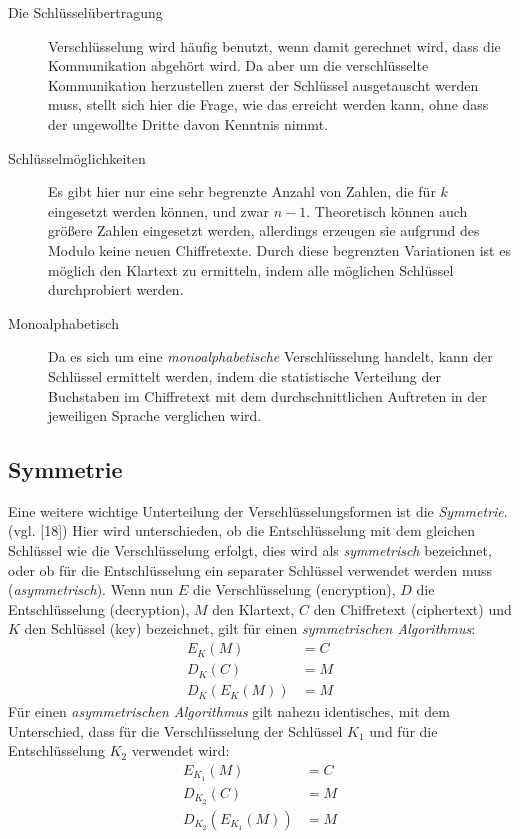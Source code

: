 \documentclass{scrarticle}
\begin{document}
    \begin{description}
        \item[Die Schlüsselübertragung] Verschlüsselung wird häufig benutzt, wenn damit gerechnet wird, dass die Kommunikation abgehört wird. Da aber um die verschlüsselte Kommunikation herzustellen zuerst der Schlüssel ausgetauscht werden muss, stellt sich hier die Frage, wie das erreicht werden kann, ohne dass der ungewollte Dritte davon Kenntnis nimmt.
        \item[Schlüsselmöglichkeiten] Es gibt hier nur eine sehr begrenzte Anzahl von Zahlen, die für $k$ eingesetzt werden können, und zwar $n-1$. Theoretisch können auch größere Zahlen eingesetzt werden, allerdings erzeugen sie aufgrund des Modulo keine neuen Chiffretexte. Durch diese begrenzten Variationen ist es möglich den Klartext zu ermitteln, indem alle möglichen Schlüssel durchprobiert werden.
        \item[Monoalphabetisch] Da es sich um eine \emph{monoalphabetische} Verschlüsselung handelt, kann der Schlüssel ermittelt werden, indem die statistische Verteilung der Buchstaben im Chiffretext mit dem durchschnittlichen Auftreten in der jeweiligen Sprache verglichen wird.
    \end{description}

    \subsection{Symmetrie}  %
        Eine weitere wichtige Unterteilung der Verschlüsselungsformen ist die \emph{Symmetrie}. (vgl. \cite{ertel2003}[18]) Hier wird unterschieden, ob die Entschlüsselung mit dem gleichen Schlüssel wie die Verschlüsselung erfolgt, dies wird als \emph{symmetrisch} bezeichnet, oder ob für die Entschlüsselung ein separater Schlüssel verwendet werden muss (\emph{asymmetrisch}). Wenn nun $E$ die Verschlüsselung (encryption), $D$ die Entschlüsselung (decryption), $M$ den Klartext, $C$ den Chiffretext (ciphertext) und $K$ den Schlüssel (key) bezeichnet, gilt für einen \emph{symmetrischen Algorithmus}: %
        \begin{align}
            E_K(M) &= C\\
            D_K(C) &= M\\
            D_K\left(E_K(M)\right) &= M
        \end{align}
        Für einen \emph{asymmetrischen Algorithmus} gilt nahezu identisches, mit dem Unterschied, dass für die Verschlüsselung der Schlüssel $K_1$ und für die Entschlüsselung $K_2$ verwendet wird:    %
        \begin{align}
            E_{K_1}(M) &= C \label{eq:funf} \\
            D_{K_2}(C) &= M \label{eq:sechs}    \\
            D_{K_2}\left(E_{K_1}(M)\right) &= M     \label{eq:sieben}
        \end{align}
\end{document}
